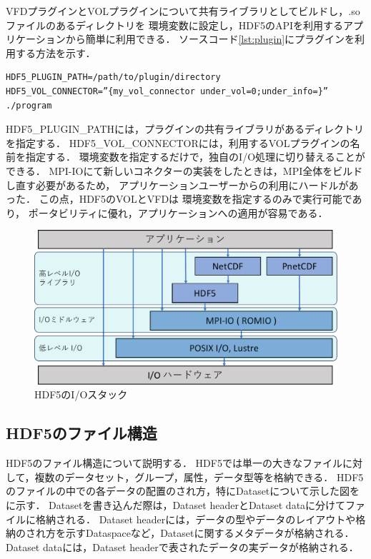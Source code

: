 \documentclass[submit,techrep,noauthor]{ipsj}
\begin{document}
VFDプラグインとVOLプラグインについて共有ライブラリとしてビルドし，.soファイルのあるディレクトリを
環境変数に設定し，HDF5のAPIを利用するアプリケーションから簡単に利用できる．
ソースコード\ref{lst:plugin}にプラグインを利用する方法を示す．
\begin{lstlisting}[caption=プラグインの利用方法, label=lst:plugin]
HDF5_PLUGIN_PATH=/path/to/plugin/directory HDF5_VOL_CONNECTOR=”{my_vol_connector under_vol=0;under_info=}” ./program
\end{lstlisting}
HDF5\_PLUGIN\_PATHには，プラグインの共有ライブラリがあるディレクトリを指定する．
HDF5\_VOL\_CONNECTORには，利用するVOLプラグインの名前を指定する．
環境変数を指定するだけで，独自のI/O処理に切り替えることができる．
MPI-IOにて新しいコネクターの実装をしたときは，MPI全体をビルドし直す必要があるため，
アプリケーションユーザーからの利用にハードルがあった．
この点，HDF5のVOLとVFDは
環境変数を指定するのみで実行可能であり，
ポータビリティに優れ，アプリケーションへの適用が容易である．


\begin{figure}[t]
	\centering
	\includegraphics[page=7,width=\linewidth]{figure-crop.pdf}
	\caption{HDF5のI/Oスタック}
	\label{fig:hdf5stack}
\end{figure}


\subsection{HDF5のファイル構造}
HDF5のファイル構造について説明する．
HDF5では単一の大きなファイルに対して，複数のデータセット，グループ，属性，データ型等を格納できる．
HDF5のファイルの中での各データの配置のされ方，特にDatasetについて示した図をに示す．
Datasetを書き込んだ際は，Dataset headerとDataset dataに分けてファイルに格納される．
Dataset headerには，データの型やデータのレイアウトや格納のされ方を示すDataspaceなど，Datasetに関するメタデータが格納される．
Dataset dataには，Dataset headerで表されたデータの実データが格納される．
\end{document}
